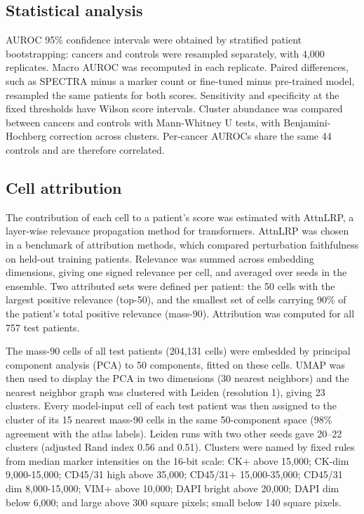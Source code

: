 \documentclass[11pt]{article}
\begin{document}
\subsection*{Statistical analysis}

AUROC 95\% confidence intervals were obtained by stratified patient bootstrapping\cite{efron1993}: cancers and controls were resampled separately, with 4,000 replicates. Macro AUROC was recomputed in each replicate. Paired differences, such as SPECTRA minus a marker count or fine-tuned minus pre-trained model, resampled the same patients for both scores. Sensitivity and specificity at the fixed thresholds have Wilson score intervals\cite{wilson1927}. Cluster abundance was compared between cancers and controls with Mann-Whitney U tests, with Benjamini-Hochberg correction\cite{benjamini1995} across clusters. Per-cancer AUROCs share the same 44 controls and are therefore correlated.

\subsection*{Cell attribution}

The contribution of each cell to a patient's score was estimated with AttnLRP, a layer-wise relevance propagation method for transformers. AttnLRP was chosen in a benchmark of attribution methods, which compared perturbation faithfulness on held-out training patients. Relevance was summed across embedding dimensions, giving one signed relevance per cell, and averaged over seeds in the ensemble. Two attributed sets were defined per patient: the 50 cells with the largest positive relevance (top-50), and the smallest set of cells carrying 90\% of the patient's total positive relevance (mass-90). Attribution was computed for all 757 test patients.

The mass-90 cells of all test patients (204,131 cells) were embedded by principal component analysis (PCA) to 50 components, fitted on these cells. UMAP\cite{mcinnes2018} was then used to display the PCA in two dimensions (30 nearest neighbors) and the nearest neighbor graph was clustered with Leiden\cite{traag2019} (resolution 1), giving 23 clusters. Every model-input cell of each test patient was then assigned to the cluster of its 15 nearest mass-90 cells in the same 50-component space (98\% agreement with the atlas labels). Leiden runs with two other seeds gave 20--22 clusters (adjusted Rand index 0.56 and 0.51). Clusters were named by fixed rules from median marker intensities on the 16-bit scale: CK+ above 15,000; CK-dim 9,000-15,000; CD45/31 high above 35,000; CD45/31+ 15,000-35,000; CD45/31 dim 8,000-15,000; VIM+ above 10,000; DAPI bright above 20,000; DAPI dim below 6,000; and large above 300 square pixels; small below 140 square pixels.
\end{document}
